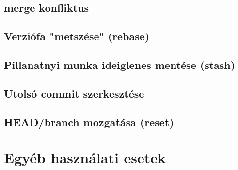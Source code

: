 	\subsection{merge konfliktus}
	\subsection{Verziófa "metszése" (rebase)}
	\subsection{Pillanatnyi munka ideiglenes mentése (stash)}
	\subsection{Utolsó commit szerkesztése}
	\subsection{HEAD/branch mozgatása (reset)}

\section{Egyéb használati esetek}



